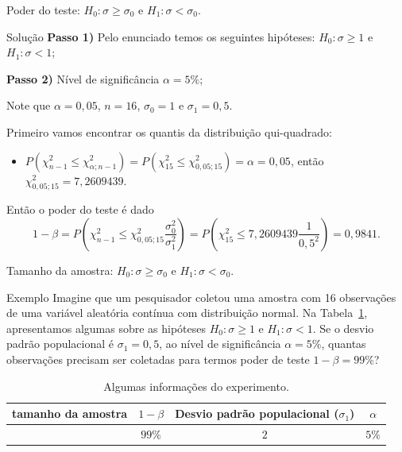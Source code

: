 \documentclass[8pt]{beamer}
\begin{document}
\begin{frame}{Poder do teste: $H_0: \sigma \geq \sigma_0$ e $H_1: \sigma < \sigma_0$.}
\begin{block}{Solução}
	\textbf{Passo 1)} Pelo enunciado temos os seguintes hipóteses: $H_0: \sigma \geq 1 $ e $H_1: \sigma < 1$;
	
	\textbf{Passo 2)} Nível de significância $\alpha=5\%$;
	
	Note que $\alpha=0,05$, $n=16$, $\sigma_0 = 1$ e $\sigma_1 = 0,5$.
	
	Primeiro vamos encontrar os quantis da distribuição qui-quadrado:
	\begin{itemize}
		\item $P\left(  \chi_{n-1}^2 \leq \chi_{\alpha;n-1}^2 \right) = P\left(  \chi_{15}^2 \leq \chi_{0,05;15}^2 \right) = \alpha=0,05$, então $\chi_{0,05;15}^2 = 7,2609439$.
	\end{itemize}
	
	Então o poder do teste é dado
	$$1-\beta =  P \left( \chi_{n-1}^2 \leq \chi_{0,05;15}^2 \frac{\sigma_0^2}{\sigma_1^2} \right) =  P \left(\chi_{15}^2 \leq 7,2609439 \frac{1}{0,5^2}  \right) = 0,9841.$$
\end{block}
\end{frame}


\begin{frame}{Tamanho da amostra: $H_0: \sigma \geq \sigma_0$ e $H_1: \sigma < \sigma_0$.}

\large
\begin{block}{Exemplo}
Imagine que um pesquisador coletou uma amostra com 16 observações de uma variável aleatória contínua com distribuição normal. Na Tabela~\ref{tab:var-test-unilateral-h0-lower-sample-size}, apresentamos algumas sobre as hipóteses $H_0: \sigma \geq 1$ e $H_1: \sigma < 1$. Se o desvio padrão populacional é $\sigma_1 = 0,5$, ao nível de significância $\alpha=5\%$, quantas observações precisam ser coletadas para termos poder de teste $1-\beta=99\%$?
\begin{table}[ht]
	\centering
	\begin{tabular}{c|c|c|c}
		\toprule[0.05cm]
		tamanho da amostra &  $1-\beta$  &  Desvio padrão populacional ($\sigma_1$) & $\alpha$ \\ 
		\midrule
		& $99\%$  & $2$ & $5\%$ \\ 
		\bottomrule[0.05cm]
	\end{tabular}
	\caption{Algumas informações do experimento.} 
	\label{tab:var-test-unilateral-h0-lower-sample-size}
\end{table}
\end{block}
\normalsize
\end{frame}
\end{document}

